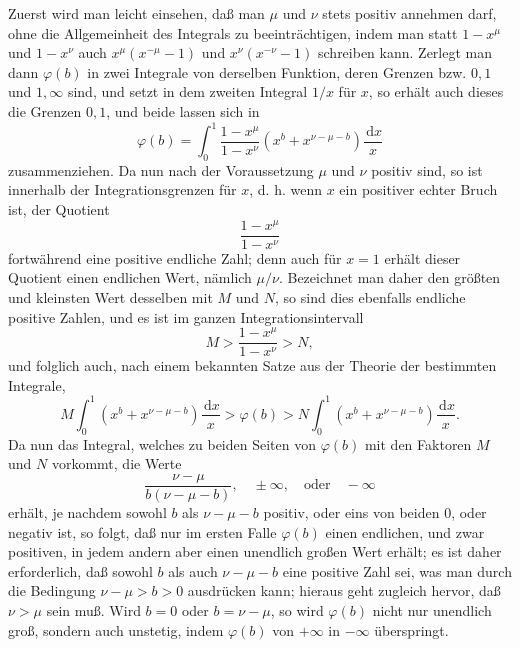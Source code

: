 \documentclass[11pt]{article}
\newcommand{\dd}{\,\mathrm d}
\begin{document}
Zuerst wird man leicht einsehen, daß man $\mu$ und $\nu$ stets positiv annehmen darf, ohne die Allgemeinheit des Integrals zu beeinträchtigen, indem man statt $1-x^\mu$ und $1-x^\nu$ auch $x^\mu(x^{-\mu}-1)$ und $x^\nu(x^{-\nu}-1)$ schreiben kann. Zerlegt man dann $\varphi(b)$ in zwei Integrale von derselben Funktion, deren Grenzen bzw. $0,1$ und $1,\infty$ sind, und setzt in dem zweiten Integral $1/x$ für $x$, so erhält auch dieses die Grenzen $0,1$, und beide lassen sich in
\begin{equation}
\varphi(b)=\int_0^1 \frac{1-x^\mu}{1-x^\nu}\left(x^b+x^{\nu-\mu-b}\right)\frac{\dd x}{x}
\tag{10}
\end{equation}
zusammenziehen. Da nun nach der Voraussetzung $\mu$ und $\nu$ positiv sind, so ist innerhalb der Integrationsgrenzen für $x$, d. h. wenn $x$ ein positiver echter Bruch ist, der Quotient
\[
\frac{1-x^\mu}{1-x^\nu}
\]
fortwährend eine positive endliche Zahl; denn auch für $x=1$ erhält dieser Quotient einen endlichen Wert, nämlich $\mu/\nu$. Bezeichnet man daher den größten und kleinsten Wert desselben mit $M$ und $N$, so sind dies ebenfalls endliche positive Zahlen, und es ist im ganzen Integrationsintervall
\[
M>\frac{1-x^\mu}{1-x^\nu}>N,
\]
und folglich auch, nach einem bekannten Satze aus der Theorie der bestimmten Integrale,
\[
M\int_0^1\left(x^b+x^{\nu-\mu-b}\right)\frac{\dd x}{x}
>\varphi(b)>
N\int_0^1\left(x^b+x^{\nu-\mu-b}\right)\frac{\dd x}{x}.
\]
Da nun das Integral, welches zu beiden Seiten von $\varphi(b)$ mit den Faktoren $M$ und $N$ vorkommt, die Werte
\[
\frac{\nu-\mu}{b(\nu-\mu-b)},\quad \pm\infty, \quad\text{oder}\quad -\infty
\]
erhält, je nachdem sowohl $b$ als $\nu-\mu-b$ positiv, oder eins von beiden $0$, oder negativ ist, so folgt, daß nur im ersten Falle $\varphi(b)$ einen endlichen, und zwar positiven, in jedem andern aber einen unendlich großen Wert erhält; es ist daher erforderlich, daß sowohl $b$ als auch $\nu-\mu-b$ eine positive Zahl sei, was man durch die Bedingung $\nu-\mu>b>0$ ausdrücken kann; hieraus geht zugleich hervor, daß $\nu>\mu$ sein muß. Wird $b=0$ oder $b=\nu-\mu$, so wird $\varphi(b)$ nicht nur unendlich groß, sondern auch unstetig, indem $\varphi(b)$ von $+\infty$ in $-\infty$ überspringt.
\end{document}
